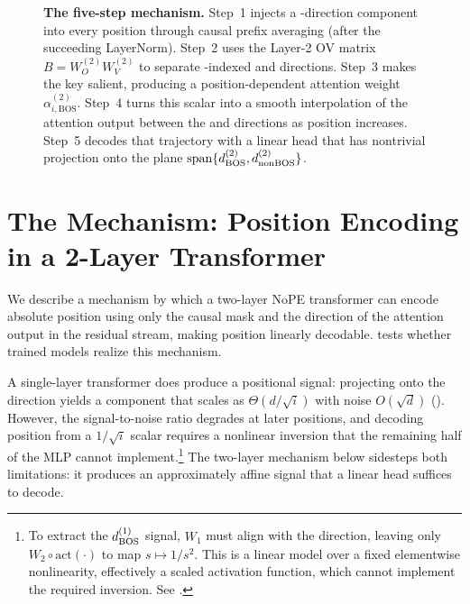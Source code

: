\documentclass{article}
\theoremstyle{plain}
\theoremstyle{definition}
\theoremstyle{remark}
\begin{document}
\begin{figure}[t]
{
}
\caption{\textbf{The five-step mechanism.} Step~1 injects a \bos-direction component into every position through causal prefix averaging (after the succeeding LayerNorm).
Step~2 uses the Layer-2 OV matrix $B=W_O^{(2)}W_V^{(2)}$ to separate \bos-indexed and \nbos directions.
Step~3 makes the \bos key salient, producing a position-dependent \bos attention weight $\alpha^{(2)}_{i,\mathrm{BOS}}$.
Step~4 turns this scalar into a smooth interpolation of the attention output between the \bos and \nbos directions as position increases.
Step~5 decodes that trajectory with a linear head that has nontrivial projection onto the plane $\mathrm{span}\{d_{\text{BOS}}^{(2)}, d_{\text{nonBOS}}^{(2)}\}$.}
\label{fig:mechanism_overview}
\vspace{-5mm}
\end{figure}

\section{The Mechanism: Position Encoding in a 2-Layer Transformer}
\label{sec:mechanism_text}
We describe a mechanism by which a two-layer NoPE
transformer can encode absolute position using only the causal
mask and the direction of the attention output in the residual stream,
making position linearly decodable.
 tests whether trained models realize this mechanism.

A single-layer transformer does produce a positional signal:
projecting onto the \bos direction yields a component that scales
as $\Theta(d/\sqrt{i})$ with noise $O(\sqrt{d})$
().
However, the signal-to-noise ratio degrades at later positions,
and decoding position from a $1/\sqrt{i}$ scalar requires
a nonlinear inversion that the remaining half of the MLP cannot
implement.\footnote{To extract the $d_{\text{BOS}}^{(1)}$ signal, $W_1$ must align with the \bos direction, leaving only $W_2 \circ \mathrm{act}(\cdot)$ to map $s \mapsto 1/s^2$. This is a linear model over a fixed elementwise nonlinearity, effectively a scaled activation function, which cannot implement the required inversion. See .}
The two-layer mechanism below sidesteps both limitations:
it produces an approximately affine signal that a linear head suffices to decode.
\end{document}
